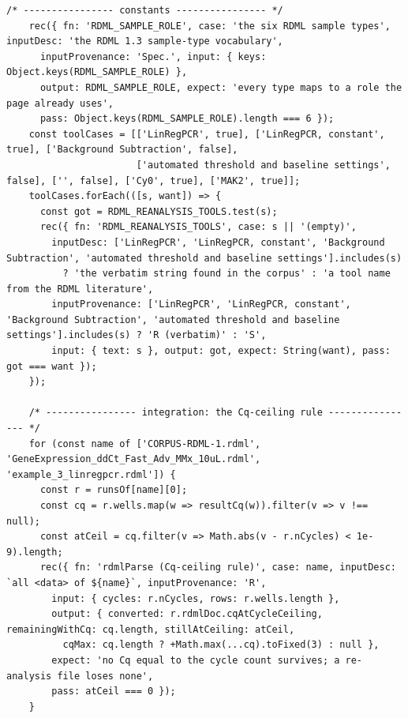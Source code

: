 \begin{lstlisting}[style=js]
    /* ---------------- constants ---------------- */
    rec({ fn: 'RDML_SAMPLE_ROLE', case: 'the six RDML sample types', inputDesc: 'the RDML 1.3 sample-type vocabulary',
      inputProvenance: 'Spec.', input: { keys: Object.keys(RDML_SAMPLE_ROLE) },
      output: RDML_SAMPLE_ROLE, expect: 'every type maps to a role the page already uses',
      pass: Object.keys(RDML_SAMPLE_ROLE).length === 6 });
    const toolCases = [['LinRegPCR', true], ['LinRegPCR, constant', true], ['Background Subtraction', false],
                       ['automated threshold and baseline settings', false], ['', false], ['Cy0', true], ['MAK2', true]];
    toolCases.forEach(([s, want]) => {
      const got = RDML_REANALYSIS_TOOLS.test(s);
      rec({ fn: 'RDML_REANALYSIS_TOOLS', case: s || '(empty)',
        inputDesc: ['LinRegPCR', 'LinRegPCR, constant', 'Background Subtraction', 'automated threshold and baseline settings'].includes(s)
          ? 'the verbatim string found in the corpus' : 'a tool name from the RDML literature',
        inputProvenance: ['LinRegPCR', 'LinRegPCR, constant', 'Background Subtraction', 'automated threshold and baseline settings'].includes(s) ? 'R (verbatim)' : 'S',
        input: { text: s }, output: got, expect: String(want), pass: got === want });
    });

    /* ---------------- integration: the Cq-ceiling rule ---------------- */
    for (const name of ['CORPUS-RDML-1.rdml', 'GeneExpression_ddCt_Fast_Adv_MMx_10uL.rdml', 'example_3_linregpcr.rdml']) {
      const r = runsOf[name][0];
      const cq = r.wells.map(w => resultCq(w)).filter(v => v !== null);
      const atCeil = cq.filter(v => Math.abs(v - r.nCycles) < 1e-9).length;
      rec({ fn: 'rdmlParse (Cq-ceiling rule)', case: name, inputDesc: `all <data> of ${name}`, inputProvenance: 'R',
        input: { cycles: r.nCycles, rows: r.wells.length },
        output: { converted: r.rdmlDoc.cqAtCycleCeiling, remainingWithCq: cq.length, stillAtCeiling: atCeil,
          cqMax: cq.length ? +Math.max(...cq).toFixed(3) : null },
        expect: 'no Cq equal to the cycle count survives; a re-analysis file loses none',
        pass: atCeil === 0 });
    }


\end{lstlisting}
